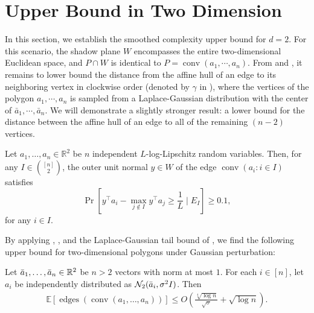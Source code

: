 \documentclass{theoretics}
\newcommand{\R}{\mathbb R}
\newcommand{\E}{\mathbb E}
\newcommand{\conv}{\operatorname{conv}}
\newcommand{\edges}{\operatorname{edges}}
\begin{document}
\section{Upper Bound in Two Dimension}\label{sec:ub-2d}

In this section, we establish the smoothed complexity upper bound for $d = 2$.
For this scenario, the shadow plane $W$ encompasses the entire two-dimensional Euclidean space, and $P \cap W$ is identical to $P = \conv(a_1, \cdots, a_n)$.
From  and , it remains to lower bound the distance from the
affine hull of an edge to its neighboring vertex in clockwise order (denoted by 
$\gamma$ in ), where the vertices of the polygon $a_1, \cdots, a_n$ is sampled from a Laplace-Gaussian distribution with the center of $\bar{a}_1, \cdots, \bar{a}_n$.
We will demonstrate a slightly stronger result: a lower bound for the distance between the
affine hull of an edge to all of the remaining $(n-2)$ vertices.

\begin{lemma}\label{lem:dist-2d}
    Let $a_1, \ldots, a_n \in \R^2$ be $n$ independent $L$-log-Lipschitz random variables.
    Then, for any $I \in \binom{[n]}{2}$, the outer unit normal
    $y \in W$ of the edge $\conv(a_i : i\in I)$ satisfies
    $$\Pr[y^\top a_i - \max_{j \notin I} y^\top a_j \geq \frac{1}{L} \mid E_I] \geq 0.1,$$
    for any $i \in I$.
\end{lemma}



By applying , , and the Laplace-Gaussian tail bound of , 
we find the following upper bound for two-dimensional polygons under Gaussian perturbation:
\begin{theorem}\label{thm:ub-2d}
    Let $\Bar{a}_1, \ldots, \Bar{a}_n \in \R^2$ be $n > 2$ vectors with norm at
    most $1$. For each $i \in [n]$, let $a_i$ be independently distributed as
    $\mathcal{N}_2(\Bar{a}_i, \sigma^2 I)$. Then \begin{align*}
        \E\left[ \edges\left(\conv(a_1, \ldots, a_n) \right) \right] \leq O\left(\frac{\sqrt[4]{\log n}}{\sqrt{\sigma}} + \sqrt{\log n}\right).
    \end{align*}
\end{theorem}
\end{document}
